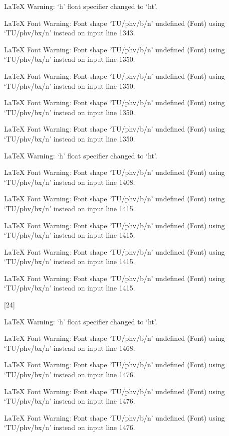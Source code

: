 LaTeX Warning: `h' float specifier changed to `ht'.


LaTeX Font Warning: Font shape `TU/phv/b/n' undefined
(Font)              using `TU/phv/bx/n' instead on input line 1343.


LaTeX Font Warning: Font shape `TU/phv/b/n' undefined
(Font)              using `TU/phv/bx/n' instead on input line 1350.


LaTeX Font Warning: Font shape `TU/phv/b/n' undefined
(Font)              using `TU/phv/bx/n' instead on input line 1350.


LaTeX Font Warning: Font shape `TU/phv/b/n' undefined
(Font)              using `TU/phv/bx/n' instead on input line 1350.


LaTeX Font Warning: Font shape `TU/phv/b/n' undefined
(Font)              using `TU/phv/bx/n' instead on input line 1350.


LaTeX Warning: `h' float specifier changed to `ht'.


LaTeX Font Warning: Font shape `TU/phv/b/n' undefined
(Font)              using `TU/phv/bx/n' instead on input line 1408.


LaTeX Font Warning: Font shape `TU/phv/b/n' undefined
(Font)              using `TU/phv/bx/n' instead on input line 1415.


LaTeX Font Warning: Font shape `TU/phv/b/n' undefined
(Font)              using `TU/phv/bx/n' instead on input line 1415.


LaTeX Font Warning: Font shape `TU/phv/b/n' undefined
(Font)              using `TU/phv/bx/n' instead on input line 1415.


LaTeX Font Warning: Font shape `TU/phv/b/n' undefined
(Font)              using `TU/phv/bx/n' instead on input line 1415.

[24]

LaTeX Warning: `h' float specifier changed to `ht'.


LaTeX Font Warning: Font shape `TU/phv/b/n' undefined
(Font)              using `TU/phv/bx/n' instead on input line 1468.


LaTeX Font Warning: Font shape `TU/phv/b/n' undefined
(Font)              using `TU/phv/bx/n' instead on input line 1476.


LaTeX Font Warning: Font shape `TU/phv/b/n' undefined
(Font)              using `TU/phv/bx/n' instead on input line 1476.


LaTeX Font Warning: Font shape `TU/phv/b/n' undefined
(Font)              using `TU/phv/bx/n' instead on input line 1476.


